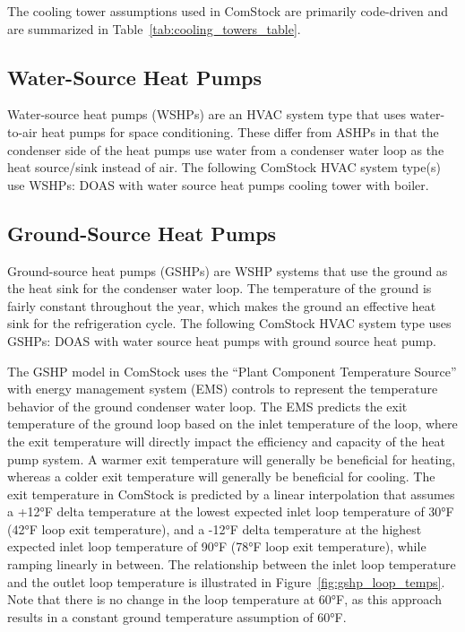 The cooling tower assumptions used in ComStock are primarily code-driven and are summarized in Table~\ref{tab:cooling_towers_table}.



\subsection{Water-Source Heat Pumps}

Water-source heat pumps (WSHPs) are an HVAC system type that uses water-to-air heat pumps for space conditioning. These differ from ASHPs in that the condenser side of the heat pumps use water from a condenser water loop as the heat source/sink instead of air. The following ComStock HVAC system type(s) use WSHPs: DOAS with water source heat pumps cooling tower with boiler.

\subsection{Ground-Source Heat Pumps}
Ground-source heat pumps (GSHPs) are WSHP systems that use the ground as the heat sink for the condenser water loop. The temperature of the ground is fairly constant throughout the year, which makes the ground an effective heat sink for the refrigeration cycle. The following ComStock HVAC system type uses GSHPs: DOAS with water source heat pumps with ground source heat pump.

The GSHP model in ComStock uses the ``Plant Component Temperature Source'' with energy management system (EMS) controls to represent the temperature behavior of the ground condenser water loop. The EMS predicts the exit temperature of the ground loop based on the inlet temperature of the loop, where the exit temperature will directly impact the efficiency and capacity of the heat pump system. A warmer exit temperature will generally be beneficial for heating, whereas a colder exit temperature will generally be beneficial for cooling. The exit temperature in ComStock is predicted by a linear interpolation that assumes a +12°F delta temperature at the lowest expected inlet loop temperature of 30°F (42°F loop exit temperature), and a -12°F delta temperature at the highest expected inlet loop temperature of 90°F (78°F loop exit temperature), while ramping linearly in between. The relationship between the inlet loop temperature and the outlet loop temperature is illustrated in Figure~\ref{fig:gshp_loop_temps}. Note that there is no change in the loop temperature at 60°F, as this approach results in a constant ground temperature assumption of 60°F.

